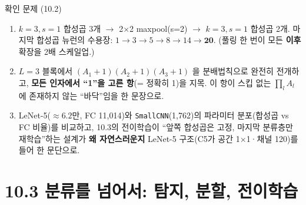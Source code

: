 \documentclass[aspectratio=169,11pt]{beamer}
\begin{document}
\begin{frame}{확인 문제 (10.2)}
  \small
  \begin{enumerate}
    \item {} $k{=}3, s{=}1$ 합성곱 3개
      $\to$ 2$\times$2 maxpool(s=2) $\to$ $k{=}3, s{=}1$ 합성곱 2개.
      마지막 합성곱 뉴런의 수용장:
      $1 \to 3 \to 5 \to 8 \to 14 \to \mathbf{20}$.
      (풀링 한 번이 모든 \textbf{이후} 확장을 2배 스케일업.)
    \item {} $L=3$ 블록에서
      $(A_1+1)(A_2+1)(A_3+1)$ 을 분배법칙으로 완전히 전개하고,
      \textbf{모든 인자에서 ``1''을 고른 항}(= 정확히 1)을
      지목. 이 항이 스킵 없는 $\prod_l A_l$ 에 존재하지 않는
      ``바닥''임을 한 문장으로.
    \item {} LeNet-5($\approx 6.2$만, FC 11,014)와
      \texttt{SmallCNN}(1,762)의 파라미터 분포(합성곱 vs FC
      비율)를 비교하고, 10.3의 전이학습이 ``앞쪽 합성곱은
      고정, 마지막 분류층만 재학습''하는 설계가 \textbf{왜
      자연스러운지} LeNet-5 구조(C5가 공간 1$\times$1·채널 120)를
      들어 한 문단으로.
  \end{enumerate}
\end{frame}

\section{10.3 분류를 넘어서: 탐지, 분할, 전이학습}
\end{document}

